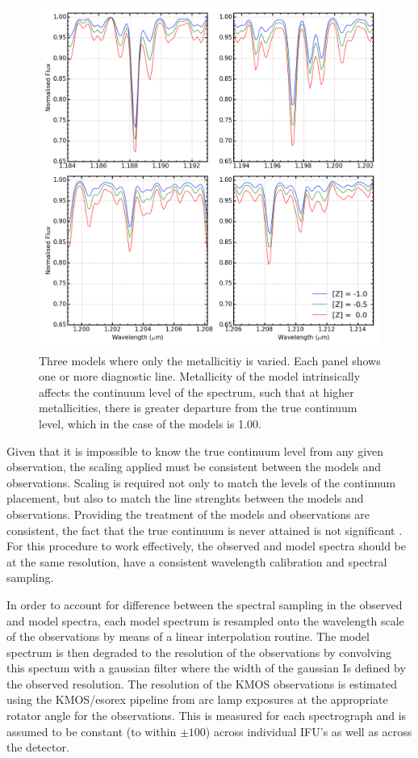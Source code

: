 \documentclass[12pt]{article}
\begin{document}
\begin{figure}
 \centering
\includegraphics[width=\textwidth]{varyZ}
\caption{
Three models where only the metallicitiy is varied.
Each panel shows one or more diagnostic line.
Metallicity of the model intrinsically affects the continuum level of the spectrum,
such that at higher metallicities, there is greater departure from the true continuum level, which in the case of the models is 1.00.\label{fig:mod-z}
         }
\end{figure}


Given that it is impossible to know the true continuum level from any given observation,
the scaling applied must be consistent between the models and observations.
Scaling is required not only to match the levels of the continnum placement, but also to match the line strenghts between the models and observations.
Providing the treatment of the models and observations are consistent, the fact that the true continuum is never attained is not significant
\citep{2014ApJ...788...58G}.
For this procedure to work effectively, the observed and model spectra should be at the same resolution, have a consistent wavelength calibration and spectral sampling.

In order to account for difference between the spectral sampling in the observed and model spectra,
each model spectrum is resampled onto the wavelength scale of the observations by means of a linear interpolation routine.
The model spectrum is then degraded to the resolution of the observations by convolving this spectum with a gaussian filter where the width of the gaussian Is defined by the observed resolution.
The resolution of the KMOS observations is estimated using the KMOS/esorex pipeline from arc lamp exposures at the appropriate rotator angle for the observations.
This is measured for each spectrograph and is assumed to be constant (to within $\pm 100$) across individual IFU's as well as across the detector.
\end{document}
